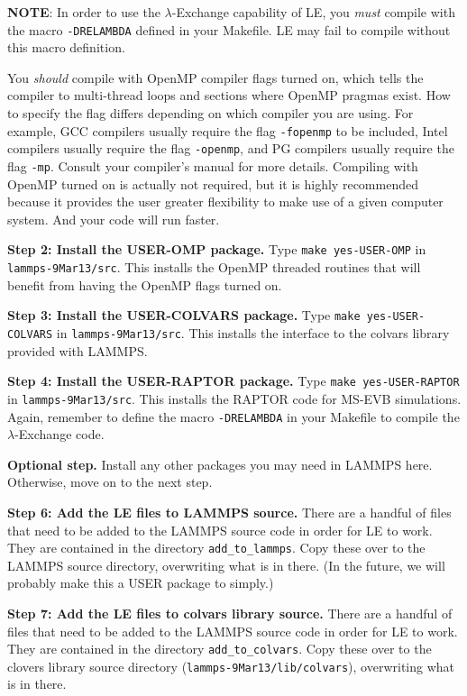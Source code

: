 \documentclass[10pt]{article}
\begin{document}
\textbf{NOTE}: In order to use the $\lambda$-Exchange capability of LE, you {\em must} compile with
the macro \texttt{-DRELAMBDA} defined in your Makefile. LE may fail to compile without this macro
definition.

You {\em should} compile with OpenMP compiler flags turned on, which tells the compiler
to multi-thread loops and sections where OpenMP pragmas exist. How to specify the flag differs 
depending on which compiler you are using. For example, GCC compilers usually require
the flag \texttt{-fopenmp} to be included, Intel compilers usually require
the flag \texttt{-openmp}, and PG compilers usually require the flag \texttt{-mp}.
Consult your compiler's manual for more details. 
Compiling with OpenMP turned on is actually not required, but it is highly recommended because
it provides the user greater flexibility to make use of a given computer system. And your code will
run faster.

\textbf{Step 2: Install the USER-OMP package.}
Type \texttt{make yes-USER-OMP} in \texttt{lammps-9Mar13/src}. This installs the OpenMP
threaded routines that will benefit from having the OpenMP flags turned on.

\textbf{Step 3: Install the USER-COLVARS package.}
Type \texttt{make yes-USER-COLVARS} in \texttt{lammps-9Mar13/src}. This installs the
interface to the colvars library provided with LAMMPS.

\textbf{Step 4: Install the USER-RAPTOR package.}
Type \texttt{make yes-USER-RAPTOR} in \texttt{lammps-9Mar13/src}. This installs the
RAPTOR code for MS-EVB simulations. Again, remember to define the macro \texttt{-DRELAMBDA} in your
Makefile to compile the $\lambda$-Exchange code.

\textbf{Optional step.} Install any other packages you may need in LAMMPS here. Otherwise, move on to the next step.

\textbf{Step 6: Add the LE files to LAMMPS source.}
There are a handful of files that need to be added to the LAMMPS source code in order
for LE to work. They are contained in the directory \texttt{add\_to\_lammps}. Copy these
over to the LAMMPS source directory, overwriting what is in there. (In the future, we
will probably make this a USER package to simply.)

\textbf{Step 7: Add the LE files to colvars library source.}
There are a handful of files that need to be added to the LAMMPS source code in order
for LE to work. They are contained in the directory \texttt{add\_to\_colvars}. Copy these
over to the clovers library source directory (\texttt{lammps-9Mar13/lib/colvars}), 
overwriting what is in there.
\end{document}
